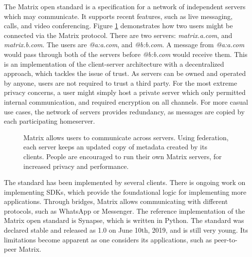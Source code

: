 The Matrix open standard\cite{matrix_org_spec} is a specification for a network of independent servers which may communicate.
It supports recent features, such as live messaging, calls, and video conferencing.
Figure \ref{fig:matrix_structure} demonstrates how two users might be connected via the Matrix protocol.
There are two servers: \textit{matrix.a.com}, and \textit{matrix.b.com}.
The users are \textit{@a:a.com}, and \textit{@b:b.com}.
A message from \textit{@a:a.com} would pass through both of the servers before \textit{@b:b.com} would receive them.
This is an implementation of the client-server architecture with a decentralized approach, which tackles the issue of trust.
As servers can be owned and operated by anyone, users are not required to trust a third party.
For the most extreme privacy concerns, a user might simply host a private server which only permitted internal communication, and required encryption on all channels.
For more casual use cases, the network of servers provides redundancy, as messages are copied by each participating homeserver.

\begin{figure}
    \centering
    \resizebox{0.7\linewidth}{!}{}
    \caption{
        Matrix allows users to communicate across servers. 
        Using federation, each server keeps an updated copy of metadata created by its clients.
        People are encouraged to run their own Matrix servers, for increased privacy and performance.
    }
    \label{fig:matrix_structure}
\end{figure}

The standard has been implemented by several clients\cite{matrix_org_clients}.
There is ongoing work on implementing SDKs\cite{matrix_org_sdks}, which provide the foundational logic for implementing more applications.
Through bridges, Matrix allows communicating with different protocols\cite{matrix_org_bridges}, such as WhatsApp or Messenger.
The reference implementation of the Matrix open standard is Synapse\cite{matrix_org_synapse}, which is written in Python.
The standard was declared stable and released as 1.0 on June 10th, 2019\cite{matrix_org_spec}, and is still very young.
Its limitations become apparent as one considers its applications, such as peer-to-peer Matrix.



